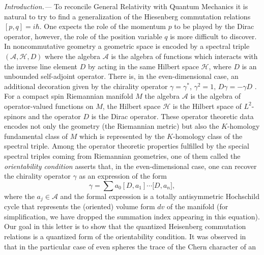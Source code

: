 \documentclass
[twocolumn,prl,unsortedaddress,superscriptaddress,showpacs]{revtex4}%
\begin{document}
\vspace{0.5cm}
\emph{Introduction.---}
To reconcile General Relativity with Quantum Mechanics it is natural to try to
find a generalization of the Hiesenberg commutation relations $[p,q]=i\hbar$.
One expects the role of the momentum $p$ to be played by the Dirac operator,
however, the role of the position variable $q$ is more difficult to discover.
In noncommutative geometry a geometric space is encoded by a spectral triple
$(\mathcal{A},\mathcal{H},D)$ where the algebra $\mathcal{A}$ is the algebra
of functions which interacts with the inverse line element $D$ by acting in
the same Hilbert space $\mathcal{H}$, where $D$ is an unbounded self-adjoint
operator. There is, in the even-dimensional case, an additional decoration
given by the chirality operator $\gamma=\gamma^{\ast}$, $\gamma^{2}=1$,
$D\gamma=-\gamma D$ \cite{AC}. For a compact spin Riemannian manifold $M$ the
algebra $\mathcal{A}$ is the algebra of operator-valued functions on $M$, the
Hilbert space $\mathcal{H}$ is the Hilbert space of $L^{2}$-spinors and the
operator $D$ is the Dirac operator. These operator theoretic data encodes not
only the geometry (the Riemannian metric) but also the $K$-homology
fundamental class of $M$ which is represented by the $K$-homology class of the
spectral triple. Among the operator theoretic properties fulfilled by the
special spectral triples coming from Riemannian geometries, one of them called
the \emph{orientability condition} asserts that, in the even-dimensional case,
one can recover the chirality operator $\gamma$ as an expression of the form
\begin{equation}
\gamma=\sum a_{0}[D,a_{1}]\cdots\lbrack D,a_{n}], \label{orientability}%
\end{equation}
where the $a_{j}\in\mathcal{A}$ and the formal expression is a totally
antisymmetric Hochschild cycle that represents the (oriented) volume form $dv$
of the manifold \cite{Connes} (for simplification, we have dropped the
summation index appearing in this equation). Our goal in this letter is to
show that the quantized Heisenberg commutation relations is a quantized form
of the orientability condition. It was observed in \cite{Connes} that in the
particular case of even spheres the trace of the Chern character of an
\end{document}
